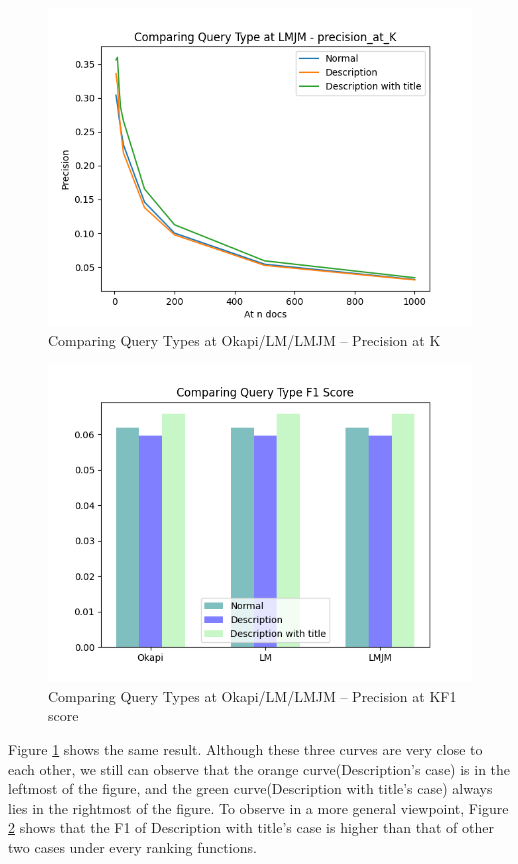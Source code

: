 \documentclass[10pt, a4paper]{article}
\begin{document}
\begin{figure}[h!]
\includegraphics[scale=0.3]{compare query/Comparing Query Type at LMJM - precision_at_K-pak.png}
\caption{Comparing Query Types at Okapi/LM/LMJM -- Precision at K}
\label{fig:q_p}
\end{figure}

\begin{figure}[h!]
\centering
\includegraphics[scale=0.4]{compare query/Comparing Query Type F1 Score.png}
\caption{Comparing Query Types at Okapi/LM/LMJM -- Precision at KF1 score}
\label{fig:q_f}
\end{figure}

Figure \ref{fig:q_p} shows the same result. Although these three curves are very close to each other, we still can observe that the orange curve(Description's case) is in the leftmost of the figure, and the green curve(Description with title's case) always lies in the rightmost of the figure. To observe in a more general viewpoint, Figure \ref{fig:q_f} shows that the F1 of Description with title's case is higher than that of other two cases under every ranking functions.
\end{document}
